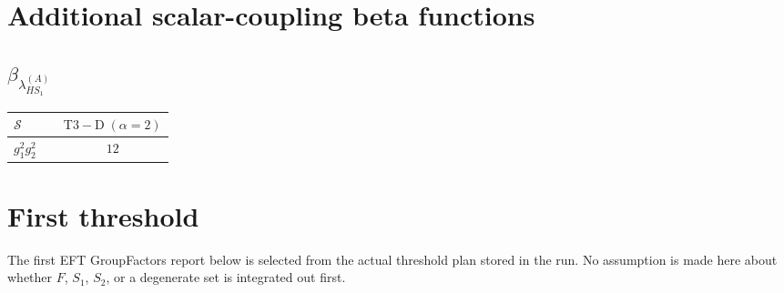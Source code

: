 \documentclass[9pt]{article}
\begin{document}
\section*{Additional scalar-coupling beta functions}
\subsection*{$ \beta_{\lambda_{HS_1}^{(A)}} $}
\begin{longtable}{@{}p{0.31\linewidth}c@{}}
\toprule
$\mathcal{S}$ & $ \mathrm{T3-D}\;(\alpha=2) $ \\
\midrule
$ g_1^2g_2^2 $ & $ 12 $ \\
\bottomrule
\end{longtable}
\section*{First threshold}
The first EFT GroupFactors report below is selected from the actual threshold plan stored in the run.  No assumption is made here about whether $F$, $S_1$, $S_2$, or a degenerate set is integrated out first.
\end{document}
